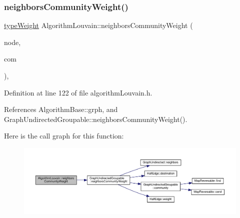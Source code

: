 \subsubsection{\texorpdfstring{neighbors\+Community\+Weight()}{neighborsCommunityWeight()}\hspace{0.1cm}{\footnotesize\ttfamily [1/2]}}
{\footnotesize\ttfamily \hyperlink{edge_8h_a2e7ea3be891ac8b52f749ec73fee6dd2}{type\+Weight} Algorithm\+Louvain\+::neighbors\+Community\+Weight (\begin{DoxyParamCaption}\item[{const \hyperlink{edge_8h_a5fbd20c46956d479cb10afc9855223f6}{type\+Vertex} \&}]{node,  }\item[{const \hyperlink{graphUndirectedGroupable_8h_a914da95c9ea7f14f4b7f875c36818556}{type\+Community} \&}]{com }\end{DoxyParamCaption})\hspace{0.3cm}{\ttfamily [inline]}, {\ttfamily [private]}}



Definition at line 122 of file algorithm\+Louvain.\+h.



References Algorithm\+Base\+::grph, and Graph\+Undirected\+Groupable\+::neighbors\+Community\+Weight().

Here is the call graph for this function\+:
\nopagebreak
\begin{figure}[H]
\begin{center}
\leavevmode
\includegraphics[width=350pt]{classAlgorithmLouvain_a133f057d5d84332e347a0f01700101ae_cgraph}
\end{center}
\end{figure}
\mbox{\label{classAlgorithmLouvain_a97fc0efead8492fc78167a3ad4f808fc}} 
